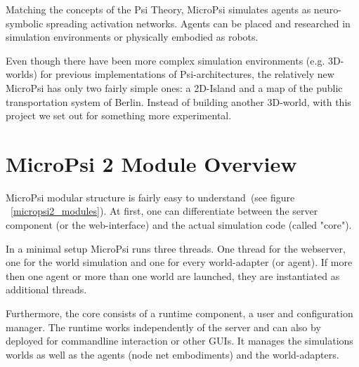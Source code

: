 Matching the concepts of the Psi Theory, MicroPsi simulates agents as neuro-symbolic spreading activation networks. Agents can be placed and researched in simulation environments or physically embodied as robots.~\cite{conf/agi/Bach12}
        
Even though there have been more complex simulation environments (e.g. 3D-worlds) for previous implementations of Psi-architectures, the relatively new MicroPsi has only two fairly simple ones: a 2D-Island and a map of the public transportation system of Berlin. Instead of building another 3D-world, with this project we set out for something more experimental.

        \section{MicroPsi 2 Module Overview}
MicroPsi modular structure is fairly easy to understand~(see figure ~\ref{micropsi2_modules}). At first, one can differentiate between the server component (or the web-interface) and the actual simulation code (called "core").

In a minimal setup MicroPsi runs three threads. One thread for the webserver, one for the world simulation and one for every world-adapter (or agent). If more then one agent or more than one world are launched, they are instantiated as additional threads.

Furthermore, the core consists of a runtime component, a user and configuration manager. The runtime works independently of the server and can also by deployed for commandline interaction or other GUIs. It manages the simulations worlds as well as the agents (node net embodiments) and the world-adapters.~\cite{conf/agi/Bach12}
\\          
          
